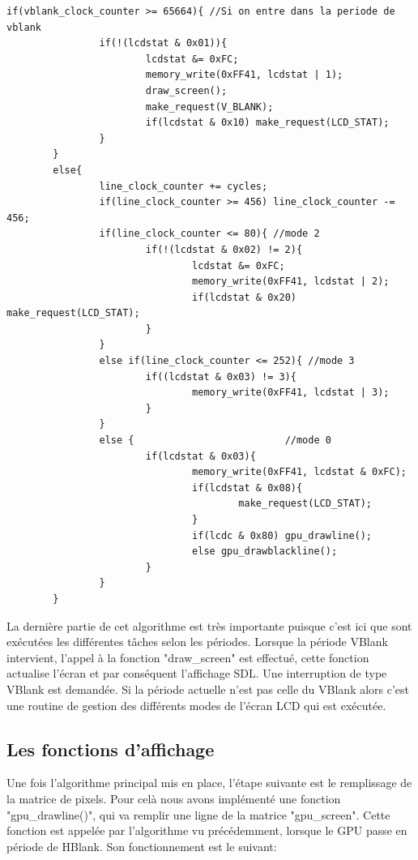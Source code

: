 \documentclass{report}
\begin{document}
\begin{lstlisting}
if(vblank_clock_counter >= 65664){ //Si on entre dans la periode de vblank
                if(!(lcdstat & 0x01)){
                        lcdstat &= 0xFC;
                        memory_write(0xFF41, lcdstat | 1);
                        draw_screen();
                        make_request(V_BLANK);
                        if(lcdstat & 0x10) make_request(LCD_STAT);
                }
        }
        else{
                line_clock_counter += cycles;
                if(line_clock_counter >= 456) line_clock_counter -= 456;
                if(line_clock_counter <= 80){ //mode 2
                        if(!(lcdstat & 0x02) != 2){
                                lcdstat &= 0xFC;
                                memory_write(0xFF41, lcdstat | 2);
                                if(lcdstat & 0x20) make_request(LCD_STAT);
                        }
                }
                else if(line_clock_counter <= 252){ //mode 3
                        if((lcdstat & 0x03) != 3){
                                memory_write(0xFF41, lcdstat | 3);
                        }
                }
                else {                          //mode 0 
                        if(lcdstat & 0x03){
                                memory_write(0xFF41, lcdstat & 0xFC);
                                if(lcdstat & 0x08){
                                        make_request(LCD_STAT);
                                }
                                if(lcdc & 0x80) gpu_drawline();
                                else gpu_drawblackline();
                        }
                }
        }

\end{lstlisting}
La dernière partie de cet algorithme est très importante puisque c'est ici que sont exécutées les différentes tâches selon les périodes. Lorsque la période VBlank intervient, l'appel à la fonction "draw\_screen" est effectué, cette fonction actualise l'écran et par conséquent l'affichage SDL. Une interruption de type VBlank est demandée. Si la période actuelle n'est pas celle du VBlank alors c'est une routine de gestion des différents modes de l'écran LCD qui est exécutée.\\

\subsection{Les fonctions d'affichage}
Une fois l'algorithme principal mis en place, l'étape suivante est le remplissage de la matrice de pixels. Pour celà nous avons implémenté une fonction "gpu\_drawline()", qui va remplir une ligne de la matrice "gpu\_screen". Cette fonction est appelée par l'algorithme vu précédemment, lorsque le GPU passe en période de HBlank. Son fonctionnement est le suivant:\\
\end{document}
